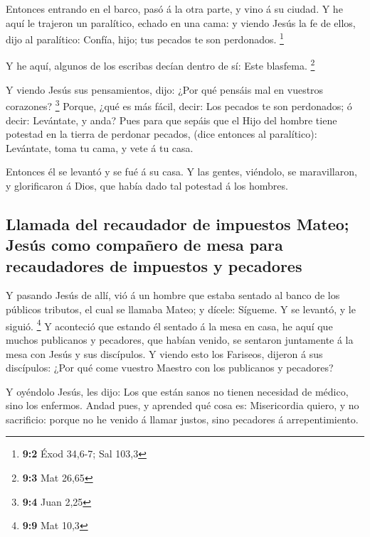  Entonces entrando en el barco, pasó á la otra parte, y vino
á su ciudad.  Y he aquí le trajeron un paralítico, echado en
una cama: y viendo Jesús la fe de ellos, dijo al paralítico: Confía,
hijo; tus pecados te son perdonados. \footnote{\textbf{9:2} Éxod 34,6-7;
  Sal 103,3}

 Y he aquí, algunos de los escribas decían dentro de sí:
Este blasfema. \footnote{\textbf{9:3} Mat 26,65}

 Y viendo Jesús sus pensamientos, dijo: ¿Por qué pensáis mal
en vuestros corazones? \footnote{\textbf{9:4} Juan 2,25} 
Porque, ¿qué es más fácil, decir: Los pecados te son perdonados; ó
decir: Levántate, y anda?  Pues para que sepáis que el Hijo
del hombre tiene potestad en la tierra de perdonar pecados, (dice
entonces al paralítico): Levántate, toma tu cama, y vete á tu casa.

 Entonces él se levantó y se fué á su casa.  Y
las gentes, viéndolo, se maravillaron, y glorificaron á Dios, que había
dado tal potestad á los hombres.

\hypertarget{llamada-del-recaudador-de-impuestos-mateo-jesuxfas-como-compauxf1ero-de-mesa-para-recaudadores-de-impuestos-y-pecadores}{%
\subsection{Llamada del recaudador de impuestos Mateo; Jesús como
compañero de mesa para recaudadores de impuestos y
pecadores}\label{llamada-del-recaudador-de-impuestos-mateo-jesuxfas-como-compauxf1ero-de-mesa-para-recaudadores-de-impuestos-y-pecadores}}

 Y pasando Jesús de allí, vió á un hombre que estaba sentado
al banco de los públicos tributos, el cual se llamaba Mateo; y dícele:
Sígueme. Y se levantó, y le siguió. \footnote{\textbf{9:9} Mat 10,3}
 Y aconteció que estando él sentado á la mesa en casa, he
aquí que muchos publicanos y pecadores, que habían venido, se sentaron
juntamente á la mesa con Jesús y sus discípulos.  Y viendo
esto los Fariseos, dijeron á sus discípulos: ¿Por qué come vuestro
Maestro con los publicanos y pecadores?

 Y oyéndolo Jesús, les dijo: Los que están sanos no tienen
necesidad de médico, sino los enfermos.  Andad pues, y
aprended qué cosa es: Misericordia quiero, y no sacrificio: porque no he
venido á llamar justos, sino pecadores á arrepentimiento.

